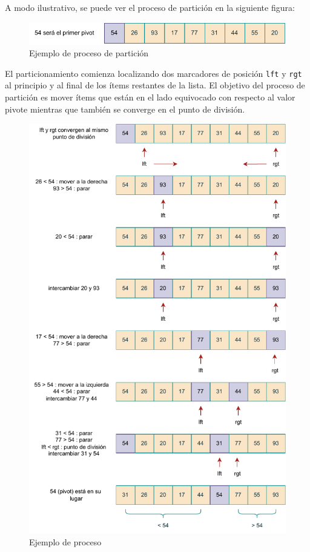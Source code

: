 A modo ilustrativo, se puede ver el proceso de partición en la siguiente figura:

\begin{figure}[h]
\centering
\includegraphics[scale=0.88]{./estáticos/pivot.pdf}
\caption{Ejemplo de proceso de partición}
\end{figure}

El particionamiento comienza localizando dos marcadores de posición \texttt{lft} y \texttt{rgt} al principio y al final de los ítems restantes de la lista. El objetivo del proceso de partición es mover ítems que están en el lado equivocado con respecto al valor pivote mientras que también se converge en el punto de división.

\begin{figure}[h]
\centering
\includegraphics[scale=0.74]{./estáticos/quick.pdf}
\caption{Ejemplo de proceso}
\end{figure}

